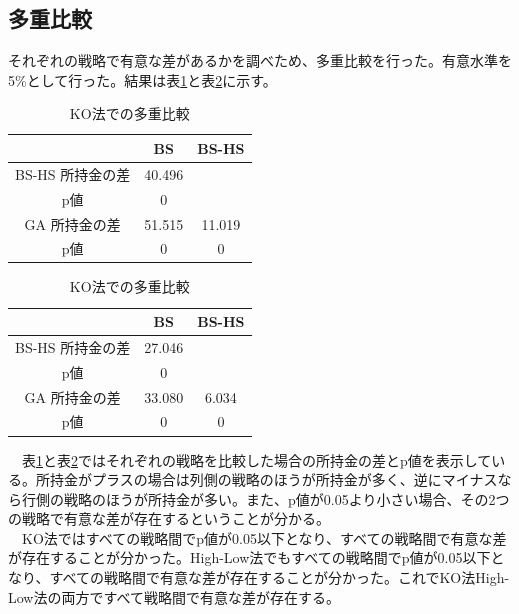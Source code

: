 \subsection{多重比較}
それぞれの戦略で有意な差があるかを調べため、多重比較を行った。有意水準を5\%として行った。結果は表\ref{multiKO}と表\ref{multiHigh-Low}に示す。
\begin{table}[H]
 \caption{KO法での多重比較\label{multiKO}}
 \begin{center}
  \begin{tabular}{|c|c|c|}
  \hline  & BS & BS-HS  \\
  \hline  BS-HS 所持金の差 & 40.496 & \\
	               p値 & 0 & \\
  \hline GA 所持金の差　& 51.515 & 11.019\\
                p値 & 0 & 0\\
  \hline
  \end{tabular}
 \end{center}
\end{table}
\begin{table}[H]
 \caption{KO法での多重比較\label{multiHigh-Low}}
 \begin{center}
  \begin{tabular}{|c|c|c|}
  \hline  & BS & BS-HS  \\
  \hline  BS-HS 所持金の差 & 27.046 & \\
	               p値 & 0 & \\
  \hline GA 所持金の差　& 33.080 & 6.034\\
                p値 & 0 & 0\\
  \hline
  \end{tabular}
 \end{center}
\end{table}
　表\ref{multiKO}と表\ref{multiHigh-Low}ではそれぞれの戦略を比較した場合の所持金の差とp値を表示している。所持金がプラスの場合は列側の戦略のほうが所持金が多く、逆にマイナスなら行側の戦略のほうが所持金が多い。また、p値が0.05より小さい場合、その2つの戦略で有意な差が存在するということが分かる。\\
　KO法ではすべての戦略間でp値が0.05以下となり、すべての戦略間で有意な差が存在することが分かった。High-Low法でもすべての戦略間でp値が0.05以下となり、すべての戦略間で有意な差が存在することが分かった。これでKO法High-Low法の両方ですべて戦略間で有意な差が存在する。
